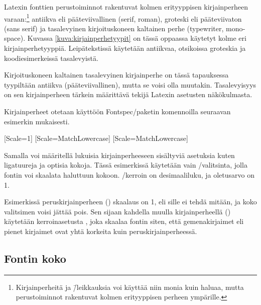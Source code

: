 Latexin fonttien perus\-toiminnot rakentuvat kolmen erityyppisen
kirjainperheen varaan:\footnote{Kirjainperheitä ja \=/leikkauksia voi
  käyttää niin monia kuin haluaa, mutta perustoiminnot rakentuvat kolmen
  erityyppisen perheen ympärille.} antiikva eli pääteviivallinen
(\textenglish{serif, roman}), groteski eli pääteviivaton
(\textenglish{sans serif}) ja tasalevyinen kirjoituskoneen kaltainen
perhe (\textenglish{typewriter, monospace}). Kuvassa
\ref{kuva:kirjainperhetyypit} on tässä oppaassa käytetyt kolme eri
kirjainperhetyyppiä. Leipätekstissä käytetään antiikvaa, otsikoissa
groteskia ja koodi\-esimerkeissä tasalevyistä.


Kirjoituskoneen kaltainen tasalevyinen kirjainperhe on tässä tapauksessa
tyypiltään antiikva (pääteviivallinen), mutta se voisi olla muutakin.
Tasalevyisyys on sen kirjainperheen tärkein määrittävä tekijä Latexin
asetusten näkökulmasta.

Kirjainperheet otetaan käyttöön Fontspec\-/paketin komennoilla seuraavan
esimerkin mukaisesti.

\begin{koodilohkosis}
  \usepackage{fontspec}
  \setmainfont{Linux Libertine O}[Scale=1]
  \setsansfont{Linux Biolinum O}[Scale=MatchLowercase]
  \setmonofont{Linux Libertine Mono O}[Scale=MatchLowercase]
\end{koodilohkosis}

Samalla voi määritellä lukuisia kirjainperheeseen sisältyviä asetuksia
kuten ligatuureja ja optisia kokoja. Tässä esimerkissä käytetään vain
\-/valitsinta, jolla fontin voi skaalata haluttuun kokoon.
\-/kerroin on desimaaliluku, ja oletus\-arvo on 1.

Esimerkissä peruskirjainperheen () skaalaus on 1,
eli sille ei tehdä mitään, ja koko valitsimen voisi jättää pois. Sen
sijaan kahdella muulla kirjainperheellä () käytetään ker\-roin\-ase\-tus\-ta
, joka skaalaa fontin siten, että
gemenakirjaimet eli pienet kirjaimet ovat yhtä korkeita kuin
peruskirjainperheessä.

\subsection{Fontin koko}


